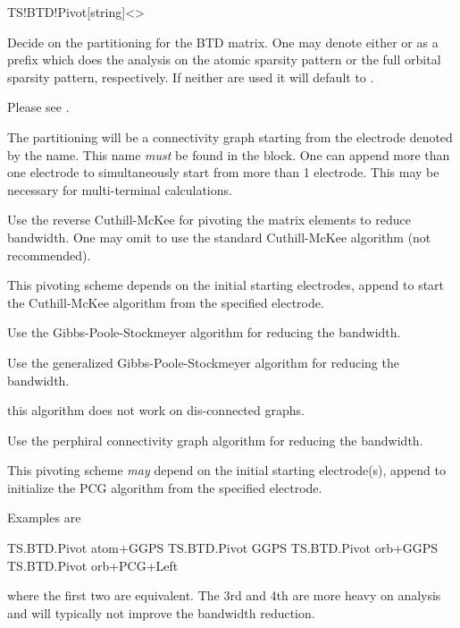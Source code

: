 \begin{fdfentry}{TS!BTD!Pivot}[string]<>

  Decide on the partitioning for the BTD matrix. One may denote either
   or  as a prefix which does the analysis on
  the atomic sparsity pattern or the full orbital sparsity pattern,
  respectively. If neither are used it will default to .

  Please see .

  \begin{fdfoptions}

    The partitioning will be a connectivity graph starting from the
    electrode denoted by the name. This name \emph{must} be found in
    the  block. One can append more than one electrode
    to simultaneously start from more than 1 electrode. This may be
    necessary for multi-terminal calculations.

    \option[rev-CM] %
    Use the reverse Cuthill-McKee for pivoting the matrix elements to
    reduce bandwidth. One may omit  to use the standard
    Cuthill-McKee algorithm (not recommended).

    This pivoting scheme depends on the initial starting
    electrodes, append  to start the Cuthill-McKee
    algorithm from the specified electrode.

    \option[GPS] %
    Use the Gibbs-Poole-Stockmeyer algorithm for reducing the
    bandwidth.

    \option[GGPS] %
    Use the generalized Gibbs-Poole-Stockmeyer algorithm for reducing
    the bandwidth.

    \note this algorithm does not work on dis-connected graphs.

    \option[PCG] %
    Use the perphiral connectivity graph algorithm for reducing the
    bandwidth.

    This pivoting scheme \emph{may} depend on the initial starting
    electrode(s), append  to initialize the PCG
    algorithm from the specified electrode.

  \end{fdfoptions}

  Examples are
  \begin{fdfexample}
    TS.BTD.Pivot atom+GGPS
    TS.BTD.Pivot GGPS
    TS.BTD.Pivot orb+GGPS
    TS.BTD.Pivot orb+PCG+Left
  \end{fdfexample}
  where the first two are equivalent. The 3rd and 4th are more heavy
  on analysis and will typically not improve the bandwidth reduction.
  
\end{fdfentry}


